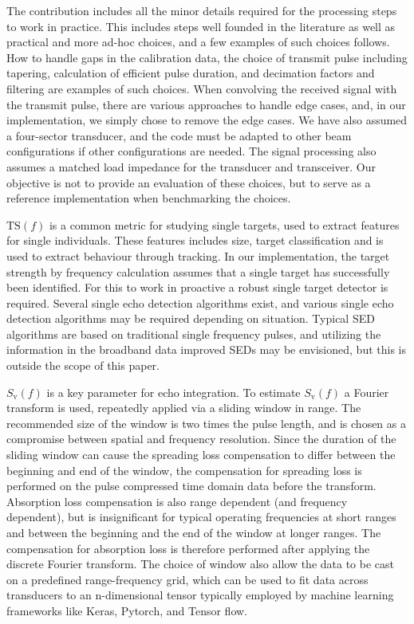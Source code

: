 \documentclass[preprint,12pt,TurnOnLineNumbers]{JASAnew}
\newcommand{\freqsym}{f}
\newcommand{\ts}{\textrm{TS}}
\newcommand{\sv}{S_{\textrm{v}}}
\begin{document}
The contribution includes all the minor details required for the processing steps to work in practice. This includes steps well founded in the literature as well as practical and more ad-hoc choices, and a few examples of such choices follows. How to handle gaps in the calibration data, the choice of transmit pulse including tapering, calculation of efficient pulse duration, and decimation factors and filtering are examples of such choices. When convolving the received signal with the transmit pulse, there are various approaches to handle edge cases, and, in our implementation, we simply chose to remove the edge cases. We have also assumed a four-sector transducer, and the code must be adapted to other beam configurations if other configurations are needed. The signal processing also assumes a matched load impedance for the transducer and transceiver. Our objective is not to provide an evaluation of these choices, but to serve as a reference implementation when benchmarking the choices.

$\ts(\freqsym)$ is a common metric for studying single targets, used to extract features for single individuals. These features includes size, target classification and is used to extract behaviour through tracking. In our implementation, the target strength by frequency calculation assumes that a single target has successfully been identified. For this to work in proactive a robust single target detector is required. Several single echo detection algorithms exist, and various single echo detection algorithms may be required depending on situation. Typical SED algorithms are based on traditional single frequency pulses, and utilizing the information in the broadband data improved SEDs may be envisioned, but this is outside the scope of this paper.

$\sv(\freqsym)$ is a key parameter for echo integration. To estimate $\sv(\freqsym)$ a Fourier transform is used, repeatedly applied via a sliding window in range. The recommended size of the window is two times the pulse length, and is chosen as a compromise between spatial and frequency resolution. Since the duration of the sliding window can cause the spreading loss compensation to differ between the beginning and end of the window, the compensation for spreading loss is performed on the pulse compressed time domain data before the transform. Absorption loss compensation is also range dependent (and frequency dependent), but is insignificant for typical operating frequencies at short ranges and between the beginning and the end of the window at longer ranges. The compensation for absorption loss is therefore performed after applying the discrete Fourier transform. The choice of window also allow the data to be cast on a predefined range-frequency grid, which can be used to fit data across transducers to an n-dimensional tensor typically employed by machine learning frameworks like Keras, Pytorch, and Tensor flow.
\end{document}

